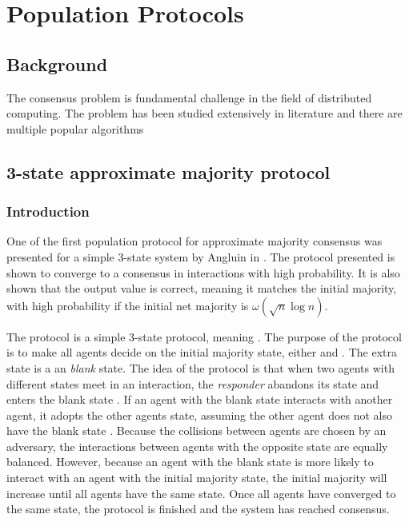 \section{Population Protocols}
\subsection{Background}

The consensus problem is fundamental challenge in the field of distributed computing. The problem has been studied extensively in literature and there are multiple popular algorithms 


\subsection{3-state approximate majority protocol} \label{3stateApproximatemajority}
\subsubsection{Introduction} \label{angluinIntroduction}

One of the first population protocol for approximate majority consensus was presented for a simple 3-state system by Angluin in \cite{angluinSimplePopulationProtocol2008}. The protocol presented is shown to converge to a consensus in  interactions with high probability. It is also shown that the output value is correct, meaning it matches the initial majority, with high probability if the initial net majority is $\omega(\sqrt{n} \log n)$.

The protocol is a simple 3-state protocol, meaning . The purpose of the protocol is to make all agents decide on the initial majority state, either  and . The extra state  is a an \emph{blank} state. The idea of the protocol is that when two agents with different states meet in an interaction, the \emph{responder} abandons its state and enters the blank state . If an agent with the blank state  interacts with another agent, it adopts the other agents state, assuming the other agent does not also have the blank state . Because the collisions between agents are chosen by an adversary, the interactions between agents with the opposite state are equally balanced. However, because an agent with the blank state is more likely to interact with an agent with the initial majority state, the initial majority will increase until all agents have the same state. Once all agents have converged to the same state, the protocol is finished and the system has reached consensus. 

